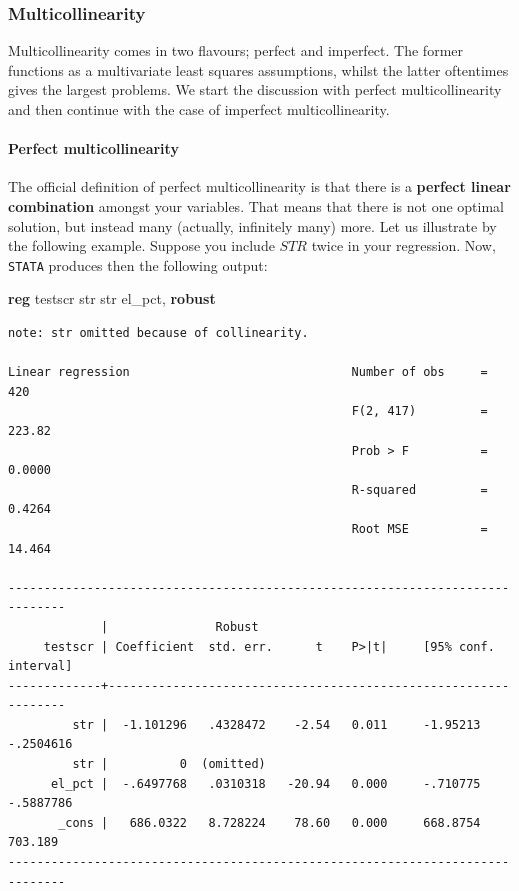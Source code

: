 \documentclass[
]{book}
\newenvironment{Shaded}{\begin{snugshade}}{\end{snugshade}}
\newcommand{\KeywordTok}[1]{\textcolor[rgb]{0.13,0.29,0.53}{\textbf{#1}}}
\newcommand{\NormalTok}[1]{#1}
\begin{document}
\hypertarget{multicollinearity}{%
\subsubsection{Multicollinearity}\label{multicollinearity}}

Multicollinearity comes in two flavours; perfect and imperfect. The former functions as a multivariate least squares assumptions, whilst the latter oftentimes gives the largest problems. We start the discussion with perfect multicollinearity and then continue with the case of imperfect multicollinearity.

\hypertarget{perfect-multicollinearity}{%
\paragraph{Perfect multicollinearity}\label{perfect-multicollinearity}}

The official definition of perfect multicollinearity is that there is a \textbf{perfect linear combination} amongst your variables. That means that there is not one optimal solution, but instead many (actually, infinitely many) more. Let us illustrate by the following example. Suppose you include \(STR\) twice in your regression. Now, \texttt{STATA} produces then the following output:

\begin{Shaded}
\begin{Highlighting}[]
\KeywordTok{reg}\NormalTok{ testscr str str el\_pct, }\KeywordTok{robust}
\end{Highlighting}
\end{Shaded}

\begin{verbatim}
note: str omitted because of collinearity.

Linear regression                               Number of obs     =        420
                                                F(2, 417)         =     223.82
                                                Prob > F          =     0.0000
                                                R-squared         =     0.4264
                                                Root MSE          =     14.464

------------------------------------------------------------------------------
             |               Robust
     testscr | Coefficient  std. err.      t    P>|t|     [95% conf. interval]
-------------+----------------------------------------------------------------
         str |  -1.101296   .4328472    -2.54   0.011     -1.95213   -.2504616
         str |          0  (omitted)
      el_pct |  -.6497768   .0310318   -20.94   0.000     -.710775   -.5887786
       _cons |   686.0322   8.728224    78.60   0.000     668.8754     703.189
------------------------------------------------------------------------------
\end{verbatim}
\end{document}
